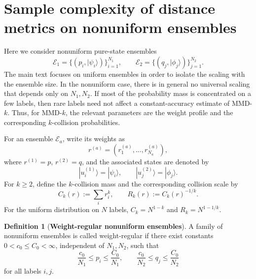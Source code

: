 \documentclass[aps,prx,reprint,superscriptaddress,amsmath,amssymb,longbibliography,floatfix]{revtex4-2}
\providecommand{\ket}[1]{|#1 \rangle}
\newcommand{\scE}{\mathcal{E}}
\theoremstyle{plain}
\theoremstyle{definition}
\newtheorem{definition}[theorem]{Definition}
\theoremstyle{remark}
\begin{document}

\section{Sample complexity of distance metrics on nonuniform ensembles}
\label{app: general case of sample complexity}

Here we consider nonuniform pure-state ensembles
\[
    \scE_1=\{(p_i,\ket{\psi_i})\}_{i=1}^{N_1},
    \qquad
    \scE_2=\{(q_j,\ket{\phi_j})\}_{j=1}^{N_2}.
\]
The main text focuses on uniform ensembles in order to isolate the scaling with the ensemble size. In the nonuniform case, there is in general no universal scaling that depends only on \(N_1,N_2\). If most of the probability mass is concentrated on a few labels, then rare labels need not affect a constant-accuracy estimate of MMD-\(k\). Thus, for MMD-\(k\), the relevant parameters are the weight profile and the corresponding \(k\)-collision probabilities.

For an ensemble \(\scE_a\), write its weights as
\[
    r^{(a)}=(r^{(a)}_1,\ldots,r^{(a)}_{N_a}),
\]
where \(r^{(1)}=p\), \(r^{(2)}=q\), and the associated states are denoted by
\[
    \ket{u_i^{(1)}}=\ket{\psi_i},
    \qquad
    \ket{u_j^{(2)}}=\ket{\phi_j}.
\]
For \(k\ge2\), define the \(k\)-collision mass and the corresponding collision scale by
\begin{equation}
    C_k(r):=\sum_i r_i^k,
    \qquad
    R_k(r):=C_k(r)^{-1/k}.
    \label{eq: nonuniform collision mass}
\end{equation}
For the uniform distribution on \(N\) labels, \(C_k=N^{1-k}\) and \(R_k=N^{1-1/k}\).

\begin{definition}[\textbf{Weight-regular nonuniform ensembles}]
    \label{def: weight regular nonuniform}
    A family of nonuniform ensembles is called weight-regular if there exist constants
    \(0<c_0\le C_0<\infty\), independent of \(N_1,N_2\), such that
    \begin{equation}
        \frac{c_0}{N_1}\le p_i\le \frac{C_0}{N_1},
        \qquad
        \frac{c_0}{N_2}\le q_j\le \frac{C_0}{N_2}
    \end{equation}
    for all labels \(i,j\).
\end{definition}
\end{document}
